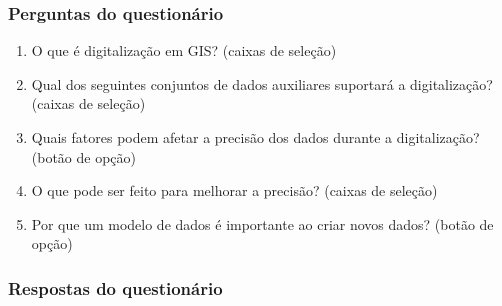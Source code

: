 \documentclass[
]{book}
\providecommand{\tightlist}{%
  \setlength{\itemsep}{0pt}\setlength{\parskip}{0pt}}
\begin{document}
\hypertarget{perguntas-do-questionuxe1rio-17}{%
\subsubsection{\texorpdfstring{\textbf{Perguntas do questionário}}{Perguntas do questionário}}\label{perguntas-do-questionuxe1rio-17}}

\begin{enumerate}
\def\labelenumi{\arabic{enumi}.}
\tightlist
\item
  O que é digitalização em GIS? (caixas de seleção)
\item
  Qual dos seguintes conjuntos de dados auxiliares suportará a digitalização? (caixas de seleção)
\item
  Quais fatores podem afetar a precisão dos dados durante a digitalização? (botão de opção)
\item
  O que pode ser feito para melhorar a precisão? (caixas de seleção)
\item
  Por que um modelo de dados é importante ao criar novos dados? (botão de opção)
\end{enumerate}

\hypertarget{respostas-do-questionuxe1rio-7}{%
\subsubsection{Respostas do questionário}\label{respostas-do-questionuxe1rio-7}}
\end{document}
